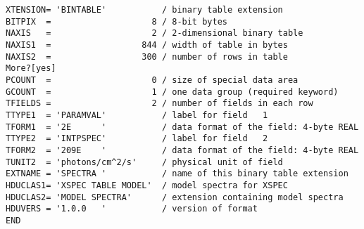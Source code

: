 \documentclass[11pt]{article}
\begin{document}
\begin{verbatim}
XTENSION= 'BINTABLE'           / binary table extension
BITPIX  =                    8 / 8-bit bytes
NAXIS   =                    2 / 2-dimensional binary table
NAXIS1  =                  844 / width of table in bytes
NAXIS2  =                  300 / number of rows in table
More?[yes] 
PCOUNT  =                    0 / size of special data area
GCOUNT  =                    1 / one data group (required keyword)
TFIELDS =                    2 / number of fields in each row
TTYPE1  = 'PARAMVAL'           / label for field   1
TFORM1  = '2E      '           / data format of the field: 4-byte REAL
TTYPE2  = 'INTPSPEC'           / label for field   2
TFORM2  = '209E    '           / data format of the field: 4-byte REAL
TUNIT2  = 'photons/cm^2/s'     / physical unit of field
EXTNAME = 'SPECTRA '           / name of this binary table extension
HDUCLAS1= 'XSPEC TABLE MODEL'  / model spectra for XSPEC
HDUCLAS2= 'MODEL SPECTRA'      / extension containing model spectra
HDUVERS = '1.0.0   '           / version of format
END
\end{verbatim}
\end{document}
